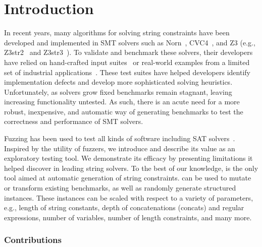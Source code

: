 \section{Introduction}

In recent years, many algorithms for solving string constraints have
been developed and implemented in SMT solvers such as Norn~\cite{norn},
CVC4~\cite{cvc4}, and Z3 (e.g., Z3str2~\cite{z3str2} and Z3str3~\cite{z3str3}).
To validate and benchmark these solvers, their developers have relied on
hand-crafted input suites~\cite{cvc4-tests,z3str3-tests,z3str2-tests} or
real-world examples from a limited set of industrial
applications~\cite{kaluza,kausler}. These test suites have helped
developers identify implementation defects and develop more
sophisticated solving heuristics. Unfortunately, as solvers grow
fixed benchmarks remain stagnant, leaving increasing functionality untested.
As such, there is an acute need for a more robust, inexpensive, and automatic way
of generating benchmarks to test
the correctness and performance of SMT solvers.

Fuzzing has been used to test all kinds of software
including SAT solvers~\cite{fuzzsat}. Inspired by the utility of fuzzers,
we introduce \fuzzer{} and describe its value
as an exploratory testing tool. We demonstrate its efficacy
by presenting limitations it helped discover in
leading string solvers. To the best of our knowledge, \fuzzer{} is the
only tool aimed at automatic generation of string constraints. \fuzzer{} can
be used to mutate or transform existing benchmarks, as well as
randomly generate structured instances. These instances can be scaled with
respect to a variety of parameters, e.g., length of string constants,
depth of concatenations (concats) and regular expressions, number of variables,
number of length constraints, and many more.

\subsubsection{Contributions}

